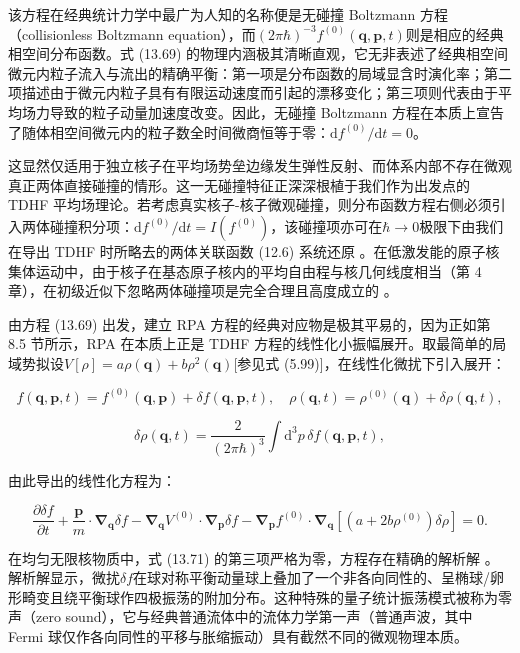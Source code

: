 该方程在经典统计力学中最广为人知的名称便是无碰撞 Boltzmann 方程（collisionless Boltzmann equation）\cite{UF74,Hu63}，而$(2\pi\hbar)^{-3}f^{(0)}(\boldsymbol{q},\boldsymbol{p},t)$则是相应的经典相空间分布函数。式
(13.69) 的物理内涵极其清晰直观，它无非表述了经典相空间微元内粒子流入与流出的精确平衡：第一项是分布函数的局域显含时演化率；第二项描述由于微元内粒子具有有限运动速度而引起的漂移变化；第三项则代表由于平均场力导致的粒子动量加速度改变。因此，无碰撞
Boltzmann 方程在本质上宣告了随体相空间微元内的粒子数全时间微商恒等于零：$\mathrm{d}f^{(0)}/\mathrm{d}t=0$。

这显然仅适用于独立核子在平均场势垒边缘发生弹性反射、而体系内部不存在微观真正两体直接碰撞的情形。这一无碰撞特征正深深根植于我们作为出发点的
TDHF 平均场理论。若考虑真实核子-核子微观碰撞，则分布函数方程右侧必须引入两体碰撞积分项：$\mathrm{d}f^{(0)}/\mathrm{d}t=I(f^{(0)})$，该碰撞项亦可在$\hbar\to0$极限下由我们在导出
TDHF 时所略去的两体关联函数 (12.6) 系统还原 \cite{KB62,Sch72a}。在低激发能的原子核集体运动中，由于核子在基态原子核内的平均自由程与核几何线度相当（第
4 章），在初级近似下忽略两体碰撞项是完全合理且高度成立的 \cite{KK68}。

由方程 (13.69) 出发，建立 RPA 方程的经典对应物是极其平易的，因为正如第 8.5 节所示，RPA 在本质上正是 TDHF
方程的线性化小振幅展开。取最简单的局域势拟设$V[\rho]=a\rho(\boldsymbol{q})+b\rho^{2}(\boldsymbol{q})${[}参见式
(5.99){]}，在线性化微扰下引入展开：

\[
f(\boldsymbol{q},\boldsymbol{p},t)=f^{(0)}(\boldsymbol{q},\boldsymbol{p})+\delta f(\boldsymbol{q},\boldsymbol{p},t),\quad\rho(\boldsymbol{q},t)=\rho^{(0)}(\boldsymbol{q})+\delta\rho(\boldsymbol{q},t),
\]

\[
\delta\rho(\boldsymbol{q},t)=\frac{2}{(2\pi\hbar)^{3}}\int\mathrm{d}^{3}p\,\delta f(\boldsymbol{q},\boldsymbol{p},t),\tag{13.70b}
\]

由此导出的线性化方程为：

\[
\frac{\partial\delta f}{\partial t}+\frac{\boldsymbol{p}}{m}\cdot\boldsymbol{\nabla}_{\boldsymbol{q}}\delta f-\boldsymbol{\nabla}_{\boldsymbol{q}}V^{(0)}\cdot\boldsymbol{\nabla}_{\boldsymbol{p}}\delta f-\boldsymbol{\nabla}_{\boldsymbol{p}}f^{(0)}\cdot\boldsymbol{\nabla}_{\boldsymbol{q}}\left[(a+2b\rho^{(0)})\delta\rho\right]=0.
\]

在均匀无限核物质中，式 (13.71) 的第三项严格为零，方程存在精确的解析解 \cite{KB62,No64a}。解析解显示，微扰$\delta f$在球对称平衡动量球上叠加了一个非各向同性的、呈椭球/卵形畸变且绕平衡球作四极振荡的附加分布。这种特殊的量子统计振荡模式被称为零声（zero
sound），它与经典普通流体中的流体力学第一声（普通声波，其中 Fermi 球仅作各向同性的平移与胀缩振动）具有截然不同的微观物理本质。

